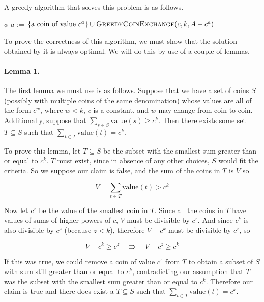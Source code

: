 \documentclass{article}
\begin{document}
A greedy algorithm that solves this problem is as follows.

\begin{algorithm}
	\begin{algorithmic}
		\Return \(\phi\)
		\EndIf
		\State \(a\) := 
		\State \Return \(\{\text{a coin of value } c^a\} \cup \Call{GreedyCoinExchange}{c, k, A - c^a}\)
		\EndFunction
	\end{algorithmic}
\end{algorithm}

To prove the correctness of this algorithm, we must show that the solution obtained by it is always optimal. We will do this by use of a couple of lemmas.

\paragraph{Lemma 1.} The first lemma we must use is as follows. Suppose that we have a set of coins \(S\) (possibly with multiple coins of the same denomination) whose values are all of the form \(c^w\), where \(w<k\), \(c\) is a constant, and \(w\) may change from coin to coin. Additionally, suppose that \(\sum_{s \in S}\text{value}(s) \geq c^k\). Then there exists some set \(T \subseteq S\) such that \(\sum_{t \in T}\text{value}(t) = c^k\).

To prove this lemma, let \(T \subseteq S\) be the subset with the smallest sum greater than or equal to \(c^k\). \(T\) must exist, since in absence of any other choices, \(S\) would fit the criteria. So we suppose our claim is false, and the sum of the coins in \(T\) is \(V\) so

\[V = \sum_{t \in T} \text{value} (t) > c^k\]

Now let \(c^z\) be the value of the smallest coin in \(T\). Since all the coins in \(T\) have values of sums of higher powers of \(c\), \(V\) must be divisible by \(c^z\). And since \(c^k\) is also divisible by \(c^z\) (because \(z < k\)), therefore \(V - c^k\) must be divisible by \(c^z\), so

\[V - c^k \geq c^z \quad \Rrightarrow \quad V - c^z \geq c^k\]

If this was true, we could remove a coin of value \(c^z\) from \(T\) to obtain a subset of \(S\) with sum still greater than or equal to \(c^k\), contradicting our assumption that \(T\) was the subset with the smallest sum greater than or equal to \(c^k\). Therefore our claim is true and there does exist a \(T \subseteq S\) such that \(\sum_{t \in T}\text{value}(t) = c^k\).
\end{document}

